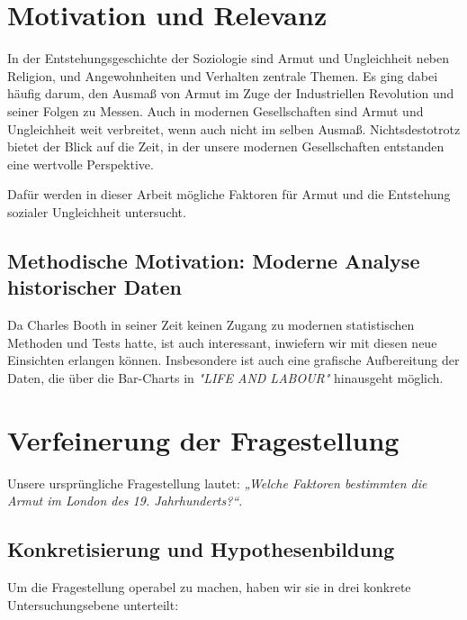 \section*{Motivation und Relevanz}
In der Entstehungsgeschichte der Soziologie sind Armut und Ungleichheit neben Religion, und Angewohnheiten und Verhalten zentrale Themen.
Es ging dabei häufig darum, den Ausmaß von Armut im Zuge der Industriellen Revolution und seiner Folgen zu Messen.
Auch in modernen Gesellschaften sind Armut und Ungleichheit weit verbreitet, wenn auch nicht im selben Ausmaß.
Nichtsdestotrotz bietet der Blick auf die Zeit, in der unsere modernen Gesellschaften entstanden eine wertvolle Perspektive.

Dafür werden in dieser Arbeit mögliche Faktoren für Armut und die Entstehung sozialer Ungleichheit untersucht.

\subsection*{Methodische Motivation: Moderne Analyse historischer Daten}
Da Charles Booth in seiner Zeit keinen Zugang zu modernen statistischen Methoden und Tests hatte, ist auch interessant,
inwiefern wir mit diesen neue Einsichten erlangen können.
Insbesondere ist auch eine grafische Aufbereitung der Daten, die über die Bar-Charts in \textit{"LIFE AND LABOUR"} hinausgeht möglich.

\section*{Verfeinerung der Fragestellung}
\label{sec:verfeinerung}

Unsere ursprüngliche Fragestellung lautet: \textit{„Welche Faktoren bestimmten die Armut im London des 19. Jahrhunderts?“}.

\subsection*{Konkretisierung und Hypothesenbildung}
Um die Fragestellung operabel zu machen, haben wir sie in drei konkrete Untersuchungsebene unterteilt:

